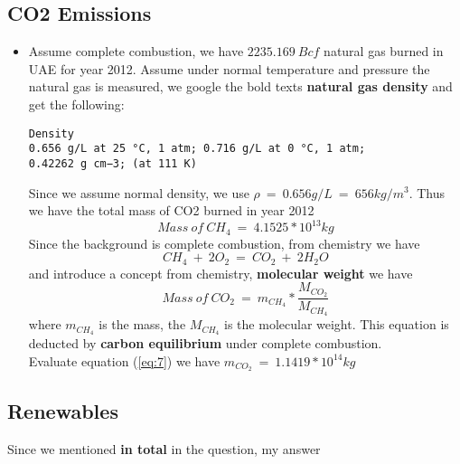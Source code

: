 \documentclass[12pt]{article}
\begin{document}
\subsection{CO2 Emissions}
\label{sec:co2-emissions}

\begin{itemize}
\item Assume complete combustion, we have $2235.169~Bcf$ natural gas
  burned in UAE for year 2012. Assume under normal temperature and
  pressure the natural gas is measured, we google the bold texts
  \textbf{natural gas density} and get the following:
\begin{verbatim}
Density
0.656 g/L at 25 °C, 1 atm; 0.716 g/L at 0 °C, 1 atm;
0.42262 g cm−3; (at 111 K)
\end{verbatim}
  Since we assume normal density, we use $\rho~=~0.656 g/L~=~656
  kg/m^{3}$. Thus we have the total mass of CO2 burned in year 2012
  \begin{equation}
    \label{eq:5}
    Mass~of~CH_{4}~=~4.1525*10^{13} kg
  \end{equation}
  Since the background is complete combustion, from chemistry we have
  \begin{equation}
    \label{eq:6}
    CH_{4}~+~2O_{2}~=~ CO_{2}~+~2H_{2}O
  \end{equation}
  and introduce a concept from chemistry, \textbf{molecular weight} we
  have 
  \begin{equation}
    \label{eq:7}
    Mass~of~CO_{2}~=~m_{CH_{4}}*\frac{M_{CO_{2}}}{M_{CH_{4}}}
  \end{equation}
  where $m_{CH_{4}}$ is the mass, the $M_{CH_{4}}$ is the molecular
  weight. This equation is deducted by \textbf{carbon equilibrium}
  under complete combustion.\\
  Evaluate equation (\ref{eq:7}) we have $m_{CO_{2}}~=~1.1419 *
  10^{14} kg$

\end{itemize}

\subsection{Renewables}
\label{sec:renewables-1}

Since we mentioned \textbf{in total} in the question,  my answer 
\end{document}
